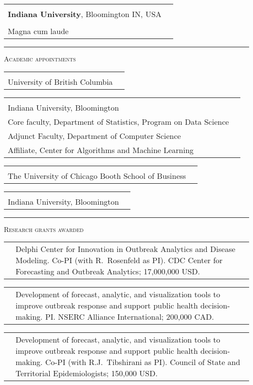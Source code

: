 \documentclass[11pt,letterpaper]{minimal/moderncv}
\makeatletter
\newcommand{\xx}{\textcolor{white}{2022}}
\newcommand{\jog}{\hspace*{2ex}}
\renewcommand{\cventry}[2]{\cvitem{#1}{\begin{minipage}[t]{\maincolumnwidth}#2\end{minipage}}}
\renewcommand{\section}[1]{  \par\addvspace{15pt}%
  \parbox[t]{\hintscolumnwidth}{\strut\raggedleft\raisebox{4pt}%
  {\rule{\hintscolumnwidth}{2pt}}}%
  \hspace{\separatorcolumnwidth}%
  \textsc{\Large #1}\par\nobreak\addvspace{6pt}%
}
\renewcommand*{\cvitem}[2]{%
  \begin{tabular}{@{}p{\hintscolumnwidth}@{\hspace{\separatorcolumnwidth}}%
    p{\maincolumnwidth}@{}}%
    \raggedleft {#1} &  {#2}%
  \end{tabular}%
}
\makeatother
\begin{document}
\vspace{3pt}
\cventry{2006}{Bachelor of Science in Music and an Outside Field\\
\textbf{Indiana 
University}, Bloomington IN, USA \\{\small Majors: Cello Performance and
Mathematics\\ \jog Magna cum laude}}


\section{Academic appointments}

\cventry{2020--\xx}{\textbf{Associate Professor of Statistics}\\University of British Columbia}

\vspace{3pt}
\cventry{2018--2020}{\textbf{Associate Professor of Statistics}\\Indiana
University, Bloomington \\ Core faculty, 
Department of Statistics, Program on Data Science \\ Adjunct
Faculty, Department of Computer Science \\ Affiliate, Center for
Algorithms and Machine Learning}

\vspace{3pt} 
\cventry{2018--2019}{\textbf{Visiting Associate Professor of Econometrics and
Statistics}\\The University of Chicago Booth School of Business} 

\vspace{3pt}
\cventry{2012--2018}{\textbf{Assistant Professor of Statistics}\\Indiana
University, Bloomington} 

\section{Research grants awarded}

\cvitem{2023--2028}{Delphi Center for Innovation in Outbreak Analytics and
Disease Modeling. Co-PI (with R.\ Rosenfeld as PI). CDC Center for Forecasting
and Outbreak Analytics; 17,000,000 USD. }

\cvitem{2023--2025}{Development of forecast, analytic, and visualization tools
to improve outbreak response and support public health decision-making. PI.
NSERC Alliance International; 200,000 CAD.}

\cvitem{2023--2024}{Development of forecast, analytic, and visualization tools
to improve outbreak response and support public health decision-making. Co-PI
(with R.J.\ Tibshirani as PI). Council of State and Territorial Epidemiologists;
150,000 USD.}
\end{document}
